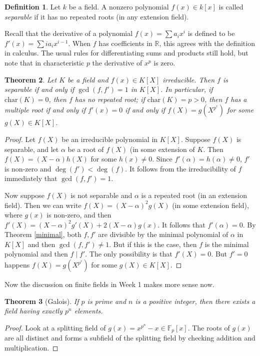 \documentclass[12pt]{report}
\newtheorem{thm}{Theorem}[section]
\theoremstyle{definition}
\newtheorem{defn}[thm]{Definition}
\def\RR{\mathbb{R}}
\def\FF{\mathbb{F}}
\def\aa{\alpha}
\def\char{\text{char}}
\begin{document}
\begin{defn}
    Let $k$ be a field. A nonzero polynomial $f(x) \in k[x]$ is called \emph{separable} if it has no repeated roots (in any extension field). 
\end{defn}

Recall that the derivative of a polynomial $f(x)=\sum a_i x^i$ is defined to be $f'(x) = \sum ia_ix^{i-1}$. When $f$ has coefficients in $\RR$, this agrees with the definition in calculus. The usual rules for differentiating sums and products still hold, but note that in characteristic $p$ the derivative of $x^p$ is zero.

\begin{thm}\label{sep}
    Let $K$ be a field and $f(x)\in K[X]$ irreducible. Then $f$ is separable if and only if $\gcd(f,f')=1$ in $K[X]$. In particular, if $\char(K)=0$, then $f$ has no repeated root; if $\char(K)=p>0$, then $f$ has a multiple root if and only if $f'(x)=0$ if and only if $f(X)=g(X^{p^r})$ for some $g(X)\in K[X]$.
\end{thm}

\begin{proof}
    Let $f(X)$ be an irreducible polynomial in $K[X]$. Suppose $f(X)$ is separable, and let $\aa$ be a root of $f(X)$ (in some extension of $K$. Then $f(X) = (X -\aa)h(X)$ for some $h(x)\not=0$. Since $f'(\aa)=h(\aa)\not=0$, $f'$ is non-zero and $\deg(f')<\deg(f)$. It follows from the irreducibility of $f$ immediately that $\gcd(f,f')=1$.

    Now suppose $f(X)$ is not separable and $\aa$ is a repeated root (in an extension field). Then we can write $f(X)=(X-\aa)^2g(X)$ (in some extension field), where $g(x)$ is non-zero, and then  $f'(X)= (X-\aa)^2g'(X)+2(X-\aa)g(x)$. It follows that $f'(\aa)=0$. By Theorem \ref{minimal}, both $f,f'$ are divisible by the minimal polynomial of $\aa$ in $K[X]$ and then $\gcd(f,f')\not=1$. But if this is the case, then $f$ is the minimal polynomial and then $f\mid f'$. The only possibility is that $f'(X)=0$. But $f'=0$ happens $f(X)=g(X^{p^r})$ for some $g(X)\in K[X]$. 
\end{proof}

Now the discussion on finite fields in Week 1 makes more sense now.

\begin{thm}[Galois]
    If $p$ is prime and $n$ is a positive integer, then there exists a field having exactly $p^n$ elements.
\end{thm}

\begin{proof}
    Look at a splitting field of $g(x)=x^{p^n}-x\in \FF_p[x]$. The roots of $g(x)$ are all distinct and forms a subfield of the splitting field by checking addition and multiplication.  
\end{proof}
\end{document}
